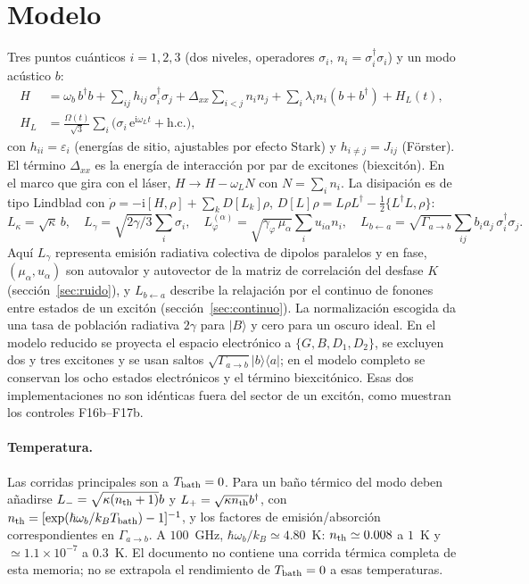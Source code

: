 \documentclass[11pt,a4paper]{article}
\newcommand{\ket}[1]{|#1\rangle}
\newcommand{\bra}[1]{\langle #1|}
\newcommand{\ee}{\mathrm{e}}
\newcommand{\ii}{\mathrm{i}}
\newcommand{\wb}{\omega_b}
\newcommand{\gphi}{\gamma_\varphi}
\newcommand{\Dxx}{\Delta_{xx}}
\begin{document}
\section{Modelo}
Tres puntos cuánticos $i=1,2,3$ (dos niveles, operadores $\sigma_i$, $n_i=\sigma_i^\dagger\sigma_i$) y un modo
acústico $b$:
\begin{align}
H &= \wb\, b^\dagger b + \sum_{ij} h_{ij}\,\sigma_i^\dagger\sigma_j + \Dxx\sum_{i<j} n_in_j
 + \sum_i \lambda_i n_i (b+b^\dagger) + H_L(t), \label{eq:H}\\
H_L &= \frac{\Omega(t)}{\sqrt3}\sum_i\big(\sigma_i\,\ee^{\ii\omega_L t}+\mathrm{h.c.}\big),
\end{align}
con $h_{ii}=\varepsilon_i$ (energías de sitio, ajustables por efecto Stark) y $h_{i\neq j}=J_{ij}$ (Förster).
El término $\Dxx$ es la energía de interacción por par de excitones (biexcitón).
En el marco que gira con el láser, $H\to H-\omega_L N$ con $N=\sum_i n_i$.
La disipación es de tipo Lindblad con $\dot\rho=-\ii[H,\rho]+\sum_k D[L_k]\rho$, $D[L]\rho=L\rho L^\dagger-\tfrac12\{L^\dagger L,\rho\}$:
\begin{equation}
L_\kappa=\sqrt{\kappa}\,b,\quad
L_\gamma=\sqrt{2\gamma/3}\textstyle\sum_i\sigma_i,\quad
L_\varphi^{(\alpha)}=\sqrt{\gphi\,\mu_\alpha}\textstyle\sum_i u_{i\alpha}n_i,\quad
L_{b\leftarrow a}=\sqrt{\Gamma_{a\to b}}\textstyle\sum_{ij}b_ia_j\,\sigma_i^\dagger\sigma_j .
\label{eq:lind}
\end{equation}
Aquí $L_\gamma$ representa emisión radiativa colectiva de dipolos paralelos y en fase,
$(\mu_\alpha,u_\alpha)$ son autovalor y autovector de la matriz de correlación del desfase $K$ (sección~\ref{sec:ruido}),
y $L_{b\leftarrow a}$ describe la relajación por el continuo de fonones entre estados de un excitón (sección~\ref{sec:continuo}).
La normalización escogida da una tasa de población radiativa $2\gamma$ para $\ket B$ y cero para un oscuro ideal.
En el modelo reducido se proyecta el espacio electrónico a $\{G,B,D_1,D_2\}$, se excluyen dos y tres
excitones y se usan saltos $\sqrt{\Gamma_{a\to b}}\ket b\!\bra a$; en el modelo completo se conservan
los ocho estados electrónicos y el término biexcitónico. Esas dos implementaciones no son idénticas
fuera del sector de un excitón, como muestran los controles F16b--F17b.

\paragraph{Temperatura.} Las corridas principales son a $T_{\rm bath}=0$. Para un baño térmico del modo
deben añadirse $L_-=\sqrt{\kappa(n_{\rm th}+1)}b$ y
$L_+=\sqrt{\kappa n_{\rm th}}b^\dagger$, con
$n_{\rm th}=[\exp(\hbar\wb/k_BT_{\rm bath})-1]^{-1}$, y los factores de emisión/absorción
correspondientes en $\Gamma_{a\to b}$. A $100$~GHz, $\hbar\wb/k_B\simeq4.80$~K:
$n_{\rm th}\simeq0.008$ a $1$~K y $\simeq1.1\times10^{-7}$ a $0.3$~K.
El documento no contiene una corrida térmica completa de esta memoria; no se extrapola el rendimiento
de $T_{\rm bath}=0$ a esas temperaturas.
\end{document}
